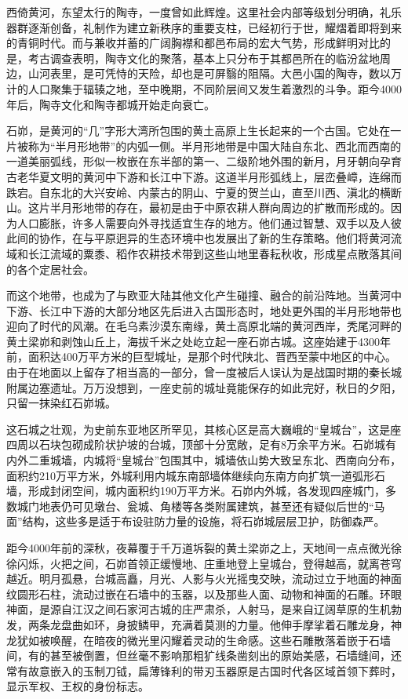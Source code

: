 西倚黄河，东望太行的陶寺，一度曾如此辉煌。这里社会内部等级划分明确，礼乐器群逐渐创备，礼制作为建立新秩序的重要支柱，已经初行于世，耀熠着即将到来的青铜时代。而与兼收并蓄的广阔胸襟和都邑布局的宏大气势，形成鲜明对比的是，考古调查表明，陶寺文化的聚落，基本上只分布于其都邑所在的临汾盆地周边，山河表里，是可凭恃的天险，却也是可屏翳的阻隔。大邑小国的陶寺，数以万计的人口聚集于辐辏之地，至中晚期，不同阶层间又发生着激烈的斗争。距今4000年后，陶寺文化和陶寺都城开始走向衰亡。

石峁，是黄河的“几”字形大湾所包围的黄土高原上生长起来的一个古国。它处在一片被称为“半月形地带”的内弧一侧。半月形地带是中国大陆自东北、西北而西南的一道美丽弧线，形似一枚嵌在东半部的第一、二级阶地外围的新月，月牙朝向孕育古老华夏文明的黄河中下游和长江中下游。这道半月形弧线上，层峦叠嶂，连绵而跌宕。自东北的大兴安岭、内蒙古的阴山、宁夏的贺兰山，直至川西、滇北的横断山。这片半月形地带的存在，最初是由于中原农耕人群向周边的扩散而形成的。因为人口膨胀，许多人需要向外寻找适宜生存的地方。他们通过智慧、双手以及人彼此间的协作，在与平原迥异的生态环境中也发展出了新的生存策略。他们将黄河流域和长江流域的粟黍、稻作农耕技术带到这些山地里春耘秋收，形成星点散落其间的各个定居社会。

而这个地带，也成为了与欧亚大陆其他文化产生碰撞、融合的前沿阵地。当黄河中下游、长江中下游的大部分地区先后进入古国形态时，地处更外围的半月形地带也迎向了时代的风潮。在毛乌素沙漠东南缘，黄土高原北端的黄河西岸，秃尾河畔的黄土梁峁和剥蚀山丘上，海拔千米之处屹立起一座石峁古城。这座始建于4300年前，面积达400万平方米的巨型城址，是那个时代陕北、晋西至蒙中地区的中心。由于在地面以上留存了相当高的一部分，曾一度被后人误认为是战国时期的秦长城附属边塞遗址。万万没想到，一座史前的城址竟能保存的如此完好，秋日的夕阳，只留一抹染红石峁城。

这石城之壮观，为史前东亚地区所罕见，其核心区是高大巍峨的“皇城台”，这是座四周以石块包砌成阶状护坡的台城，顶部十分宽敞，足有8万余平方米。石峁城有内外二重城墙，内城将“皇城台”包围其中，城墙依山势大致呈东北、西南向分布，面积约210万平方米，外城利用内城东南部墙体继续向东南方向扩筑一道弧形石墙，形成封闭空间，城内面积约190万平方米。石峁内外城，各发现四座城门，多数城门地表仍可见墩台、瓮城、角楼等各类附属建筑，甚至还有疑似后世的“马面”结构，这些多是适于布设驻防力量的设施，将石峁城层层卫护，防御森严。

距今4000年前的深秋，夜幕覆于千万道坼裂的黄土梁峁之上，天地间一点点微光徐徐闪烁，火把之间，石峁首领正缓慢地、庄重地登上皇城台，登得越高，就离苍穹越近。明月孤悬，台城高矗，月光、人影与火光摇曳交映，流动过立于地面的神面纹圆形石柱，流动过嵌在石墙中的玉器，以及那些人面、动物和神面的石雕。环眼神面，是源自江汉之间石家河古城的庄严肃杀，人射马，是来自辽阔草原的生机勃发，两条龙盘曲如环，身披鳞甲，充满着莫测的力量。他伸手摩挲着石雕龙身，神龙犹如被唤醒，在暗夜的微光里闪耀着灵动的生命感。这些石雕散落着嵌于石墙间，有的甚至被倒置，但丝毫不影响那粗犷线条凿刻出的原始美感，石墙缝间，还常有故意嵌入的玉制刀钺，扁薄锋利的带刃玉器原是古国时代各区域首领下葬时，显示军权、王权的身份标志。

